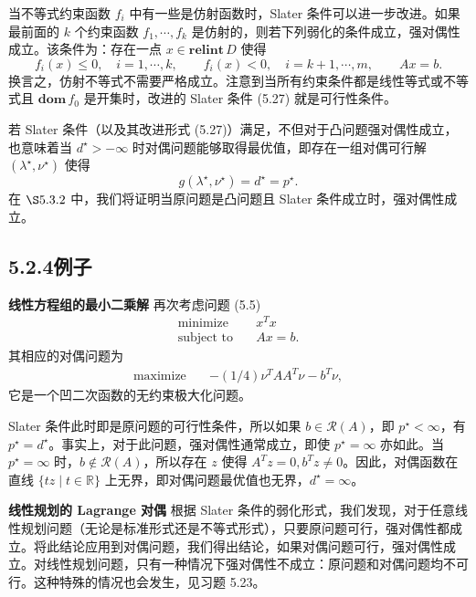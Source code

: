 \documentclass[UTF8,12pt,a4paper,fontset=fandol]{ctexart}
\begin{document}
当不等式约束函数 $f_i$ 中有一些是仿射函数时，Slater 条件可以进一步改进。如果最前面的 $k$ 个约束函数 $f_1,\cdots,f_k$ 是仿射的，则若下列弱化的条件成立，强对偶性成立。该条件为：存在一点 $x\in\mathbf{relint}\,D$ 使得
\begin{equation}
f_i(x)\leq 0,\quad i=1,\cdots,k,\qquad
f_i(x)<0,\quad i=k+1,\cdots,m,\qquad
Ax=b.
\tag{5.27}
\end{equation}
换言之，仿射不等式不需要严格成立。注意到当所有约束条件都是线性等式或不等式且 $\mathbf{dom}\,f_0$ 是开集时，改进的 Slater 条件 (5.27) 就是可行性条件。

若 Slater 条件（以及其改进形式 (5.27)）满足，不但对于凸问题强对偶性成立，也意味着当 $d^\star>-\infty$ 时对偶问题能够取得最优值，即存在一组对偶可行解 $(\lambda^\star,\nu^\star)$ 使得
\[
g(\lambda^\star,\nu^\star)=d^\star=p^\star.
\]
在 $\S 5.3.2$ 中，我们将证明当原问题是凸问题且 Slater 条件成立时，强对偶性成立。

\subsection*{5.2.4\quad 例子}

\noindent\textbf{线性方程组的最小二乘解}\quad
再次考虑问题 (5.5)
\[
\begin{aligned}
\text{minimize}\quad & x^T x\\
\text{subject to}\quad & Ax=b.
\end{aligned}
\]
其相应的对偶问题为
\[
\begin{aligned}
\text{maximize}\quad & -(1/4)\nu^TAA^T\nu-b^T\nu,
\end{aligned}
\]
它是一个凹二次函数的无约束极大化问题。

Slater 条件此时即是原问题的可行性条件，所以如果 $b\in\mathcal{R}(A)$，即 $p^\star<\infty$，有 $p^\star=d^\star$。事实上，对于此问题，强对偶性通常成立，即使 $p^\star=\infty$ 亦如此。当 $p^\star=\infty$ 时，$b\notin\mathcal{R}(A)$，所以存在 $z$ 使得 $A^Tz=0,b^Tz\neq 0$。因此，对偶函数在直线 $\{tz\mid t\in\mathbb{R}\}$ 上无界，即对偶问题最优值也无界，$d^\star=\infty$。

\noindent\textbf{线性规划的 Lagrange 对偶}\quad
根据 Slater 条件的弱化形式，我们发现，对于任意线性规划问题（无论是标准形式还是不等式形式），只要原问题可行，强对偶性都成立。将此结论应用到对偶问题，我们得出结论，如果对偶问题可行，强对偶性成立。对线性规划问题，只有一种情况下强对偶性不成立：原问题和对偶问题均不可行。这种特殊的情况也会发生，见习题 5.23。
\end{document}
